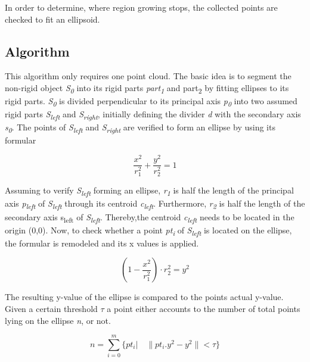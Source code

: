 In order to determine, where region growing stops, the collected points are checked to fit an ellipsoid.

\subsection{Algorithm}

This algorithm only requires one point cloud. The basic idea is to segment the non-rigid object  \textit{S\textsubscript{0}} into its rigid parts \textit{part\textsubscript{1}} and {part\textsubscript{2}} by fitting ellipses to its rigid parts. 
\textit{S\textsubscript{0}} is divided perpendicular to its principal axis \textit{p\textsubscript{0}} into two assumed rigid parts \textit{S\textsubscript{left}} and \textit{S\textsubscript{right}}, initially defining the divider \textit{d} with the secondary axis \textit{s\textsubscript{0}}. The points of \textit{S\textsubscript{left}} and \textit{S\textsubscript{right}} are verified to 
form an ellipse by using its formular

\begin{equation*}
\dfrac{x^2}{r_1^2} + \dfrac{y^2}{r_2^2} = 1
\end{equation*}

Assuming to verify \textit{S\textsubscript{left}} forming an ellipse, \textit{r\textsubscript{1}} is half the length of the principal axis \textit{p\textsubscript{left}} of \textit{S\textsubscript{left}} through its centroid \textit{c\textsubscript{left}}. Furthermore, \textit{r\textsubscript{2}} is half the length of the secondary axis {s\textsubscript{left}} of \textit{S\textsubscript{left}}. Thereby,the centroid \textit{c\textsubscript{left}} needs to be located in the origin (0,0). 
Now, to check whether a point \textit{pt\textsubscript{i}} of \textit{S\textsubscript{left}} is located on the ellipse, the formular is remodeled and its x values is applied. 

\begin{equation*}
	(1 -  \dfrac{x^2}{r_1^2}) \cdot {r_2^2} = y^2
\end{equation*}

The resulting y-value of the ellipse is compared to the points actual y-value. Given a certain threshold $\tau$ a point either accounts to the number of total points lying on the ellipse \textit{n}, or not.

\begin{equation*}
	 n = \sum_{i=0}^{m}\{pt_i \vert \quad \|pt_i.y^2 - y^2 \| < \tau\}
\end{equation*}

